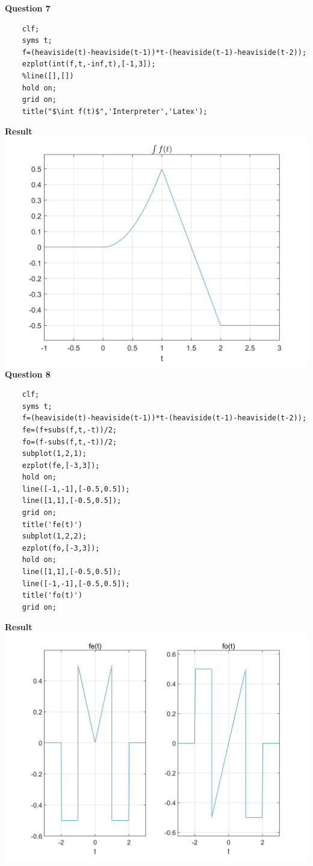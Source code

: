\documentclass[UTF8,a4paper]{article}
\begin{document}
\textbf{Question 7}\\
\begin{lstlisting}
    clf;
    syms t;
    f=(heaviside(t)-heaviside(t-1))*t-(heaviside(t-1)-heaviside(t-2));
    ezplot(int(f,t,-inf,t),[-1,3]);
    %line([],[])
    hold on;
    grid on;
    title("$\int f(t)$",'Interpreter','Latex');
\end{lstlisting}
\textbf{Result}\\
\includegraphics[scale=0.6]{符号1-7.png}\\
\textbf{Question 8}\\
\begin{lstlisting}
    clf;
    syms t;
    f=(heaviside(t)-heaviside(t-1))*t-(heaviside(t-1)-heaviside(t-2));
    fe=(f+subs(f,t,-t))/2;
    fo=(f-subs(f,t,-t))/2;
    subplot(1,2,1);
    ezplot(fe,[-3,3]);
    hold on;
    line([-1,-1],[-0.5,0.5]);
    line([1,1],[-0.5,0.5]);
    grid on;
    title('fe(t)')
    subplot(1,2,2);
    ezplot(fo,[-3,3]);
    hold on;
    line([1,1],[-0.5,0.5]);
    line([-1,-1],[-0.5,0.5]);
    title('fo(t)')
    grid on;
\end{lstlisting}
\textbf{Result}\\
\includegraphics[scale=0.6]{符号1-8.png}\\
\end{document}
